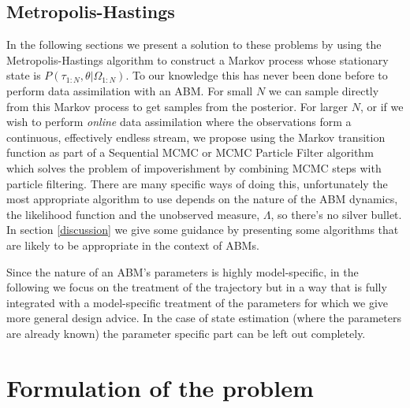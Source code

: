 \documentclass{article}
\begin{document}
\subsection{Metropolis-Hastings}
In the following sections we present a solution to these problems by using the Metropolis-Hastings algorithm to construct a Markov process whose stationary state is $P(\tau_{1:N},\theta|\Omega_{1:N})$. To our knowledge this has never been done before to perform data assimilation with an ABM. For small $N$ we can sample directly from this Markov process to get samples from the posterior. For larger $N$, or if we wish to perform \textit{online} data assimilation where the observations form a continuous, effectively endless stream, we propose using the Markov transition function as part of a Sequential MCMC or MCMC Particle Filter algorithm \citep*{finke2020limit, septier2009mcmc} which solves the problem of impoverishment by combining MCMC steps with particle filtering. There are many specific ways of doing this, unfortunately the most appropriate algorithm to use depends on the nature of the ABM dynamics, the likelihood function and the unobserved measure, $\Lambda$, so there's no silver bullet. In section \ref{discussion} we give some guidance by presenting some algorithms that are likely to be appropriate in the context of ABMs.

Since the nature of an ABM's parameters is highly model-specific, in the following we focus on the treatment of the trajectory but in a way that is fully integrated with a model-specific treatment of the parameters for which we give more general design advice. In the case of state estimation (where the parameters are already known) the parameter specific part can be left out completely.

\section{Formulation of the problem}
\end{document}

